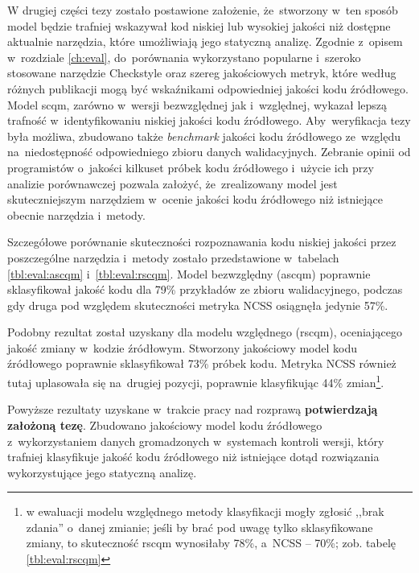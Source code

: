 \documentclass[twoside]{praca}
\begin{document}
W drugiej części tezy zostało postawione założenie, że~stworzony w~ten sposób model będzie trafniej wskazywał kod niskiej lub wysokiej jakości niż dostępne aktualnie narzędzia, które umożliwiają jego statyczną analizę. Zgodnie z~opisem w~rozdziale \ref{ch:eval}, do~porównania wykorzystano popularne i~szeroko stosowane narzędzie Checkstyle oraz szereg jakościowych metryk, które według różnych publikacji mogą być wskaźnikami odpowiedniej jakości kodu źródłowego. Model \gls{scqm}, zarówno w~wersji bezwzględnej jak i~względnej, wykazał lepszą trafność w~identyfikowaniu niskiej jakości kodu źródłowego. Aby~weryfikacja tezy była możliwa, zbudowano także \textit{benchmark} jakości kodu źródłowego ze~względu na~niedostępność odpowiedniego zbioru danych walidacyjnych. Zebranie opinii od programistów o~jakości kilkuset próbek kodu źródłowego i~użycie ich przy analizie porównawczej pozwala założyć, że~zrealizowany model jest skuteczniejszym narzędziem w~ocenie jakości kodu źródłowego niż istniejące obecnie narzędzia i~metody.


Szczegółowe porównanie skuteczności rozpoznawania kodu niskiej jakości przez poszczególne narzędzia i~metody zostało przedstawione w~tabelach \ref{tbl:eval:ascqm} i~\ref{tbl:eval:rscqm}. Model bezwzględny (\gls{ascqm}) poprawnie sklasyfikował jakość kodu dla 79\% przykładów ze zbioru walidacyjnego, podczas gdy druga pod względem skuteczności metryka NCSS osiągnęła jedynie 57\%.

Podobny rezultat został uzyskany dla modelu względnego (\gls{rscqm}), oceniającego jakość zmiany w~kodzie źródłowym. Stworzony jakościowy model kodu źródłowego poprawnie sklasyfikował 73\% próbek kodu. Metryka NCSS również tutaj uplasowała się na~drugiej pozycji, poprawnie klasyfikując 44\% zmian\footnote{w ewaluacji modelu względnego metody klasyfikacji mogły zgłosić ,,brak zdania'' o~danej zmianie; jeśli by brać pod uwagę tylko sklasyfikowane zmiany, to skuteczność \gls{rscqm} wynosiłaby 78\%, a~NCSS -- 70\%; zob. tabelę \ref{tbl:eval:rscqm}}.

Powyższe rezultaty uzyskane w~trakcie pracy nad rozprawą \textbf{potwierdzają założoną tezę}. Zbudowano jakościowy model kodu źródłowego z~wykorzystaniem danych gromadzonych w~systemach kontroli wersji, który trafniej klasyfikuje jakość kodu źródłowego niż istniejące dotąd rozwiązania wykorzystujące jego statyczną analizę.
\end{document}
